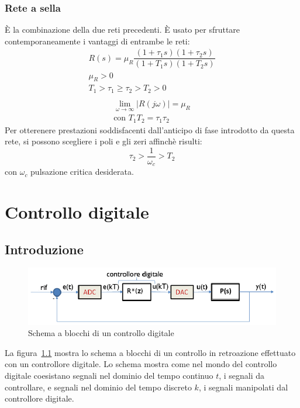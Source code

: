 \documentclass[a4paper]{report}
\begin{document}
\subsection{Rete a sella}
\`E la combinazione della due reti precedenti. \`E usato per sfruttare
contemporaneamente i vantaggi di entrambe le reti:
\begin{equation}
  \begin{array}{l}
  R(s) = \mu_R \dfrac{(1 + \tau_1 s)(1 + \tau_2 s)}{(1 + T_1 s)(1 +
    T_2 s)}\\
  \mu_R > 0\\
  T_1 > \tau_1 \geq \tau_2 > T_2 > 0\\
  \end{array}
\end{equation}
\begin{equation}
  \begin{array}{l}
    \lim_{\omega \to \infty} |R(j \omega)| = \mu_R\\
    \textrm{con } T_1T_2 = \tau_1 \tau_2
  \end{array}
\end{equation}
Per otterenere prestazioni soddisfacenti dall'anticipo di fase
introdotto da questa rete, si possono scegliere i poli e gli zeri
affinch\`e risulti:
\[
\tau_2 > \dfrac{1}{\omega_c} > T_2
\]
con $\omega_c$ pulsazione critica desiderata.

\chapter{Controllo digitale}
\section{Introduzione}
\begin{figure}[!hbp]
  \begin{center}
    \includegraphics[scale=0.5]{./images/controlloDigitale00}
    \caption{Schema a blocchi di un controllo digitale}\label{fig:controlloDigitale00}
  \end{center}
\end{figure} 
La figura~\ref{fig:controlloDigitale00} mostra lo schema a blocchi di
un controllo in retroazione effettuato con un controllore digitale. Lo
schema mostra come nel mondo del controllo digitale coesistano segnali
nel dominio del tempo continuo $t$, i segnali da controllare, e
segnali nel dominio del tempo discreto $k$, i segnali manipolati dal
controllore digitale.
\end{document}
